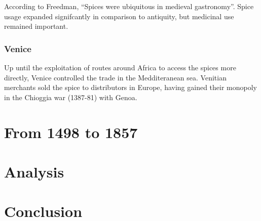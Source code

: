 \documentclass[11pt, a4paper, headings=standardclasses]{scrartcl}
\begin{document}
According to Freedman, ``Spices were ubiquitous in medieval gastronomy''.\autocite[3]{MST} Spice usage expanded signifcantly in comparison to antiquity, but medicinal use remained important.\autocite{RIS}

\subsubsection{Venice}

Up until the exploitation of routes around Africa to access the spices more directly, Venice controlled the trade in the Medditeranean sea. Venitian merchants sold the spice to distributors in Europe, having gained their monopoly in the Chioggia war (1387-81) with Genoa.\autocite{SpiceTrade}
\section{From 1498 to 1857}
\section{Analysis}
\section{Conclusion}
\clearpage
\appendix
\printbibliography
\end{document}
